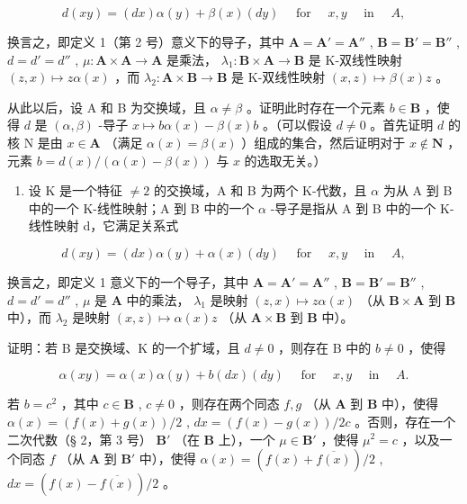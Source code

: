 \[
d (x y) = (d x) \alpha (y) + \beta (x) (d y) \quad \text { for } \quad x, y \quad \text { in } \quad A,
\]

换言之，即定义 1（第 2 号）意义下的导子，其中 \(\mathbf{A} = \mathbf{A}' = \mathbf{A}''\) , \(\mathbf{B} = \mathbf{B}' = \mathbf{B}''\) , \(d = d' = d''\) , \(\mu: \mathbf{A} \times \mathbf{A} \to \mathbf{A}\) 是乘法， \(\lambda_1: \mathbf{B} \times \mathbf{A} \to \mathbf{B}\) 是 K-双线性映射 \((z, x) \mapsto z\alpha(x)\) ，而 \(\lambda_2: \mathbf{A} \times \mathbf{B} \to \mathbf{B}\) 是 K-双线性映射 \((x, z) \mapsto \beta(x)z\) 。

从此以后，设 A 和 B 为交换域，且 \(\alpha \neq \beta\) 。证明此时存在一个元素 \(b \in \mathbf{B}\) ，使得 \(d\) 是 \((\alpha, \beta)\) -导子 \(x \mapsto b\alpha(x) - \beta(x)b\) 。（可以假设 \(d \neq 0\) 。首先证明 \(d\) 的核 N 是由 \(x \in \mathbf{A}\) （满足 \(\alpha(x) = \beta(x)\) ）组成的集合，然后证明对于 \(x \notin \mathbf{N}\) ，元素 \(b = d(x)/( \alpha(x) - \beta(x))\) 与 \(x\) 的选取无关。）

\begin{enumerate}
\def\labelenumi{\arabic{enumi}.}
\setcounter{enumi}{1}
\tightlist
\item
  设 K 是一个特征 \(\neq2\) 的交换域，A 和 B 为两个 K-代数，且 \(\alpha\) 为从 A 到 B 中的一个 K-线性映射；A 到 B 中的一个 \(\alpha\) -导子是指从 A 到 B 中的一个 K-线性映射 d，它满足关系式
\end{enumerate}

\[
d (x y) = (d x) \alpha (y) + \alpha (x) (d y) \quad \text { for } \quad x, y \quad \text { in } \quad A,
\]

换言之，即定义 1 意义下的一个导子，其中 \(\mathbf{A} = \mathbf{A}' = \mathbf{A}''\) , \(\mathbf{B} = \mathbf{B}' = \mathbf{B}''\) , \(d = d' = d''\) , \(\mu\) 是 \(\mathbf{A}\) 中的乘法， \(\lambda_1\) 是映射 \((z,x) \mapsto z\alpha(x)\) （从 \(\mathbf{B} \times \mathbf{A}\) 到 \(\mathbf{B}\) 中），而 \(\lambda_2\) 是映射 \((x,z) \mapsto \alpha(x)z\) （从 \(\mathbf{A} \times \mathbf{B}\) 到 \(\mathbf{B}\) 中）。

证明：若 B 是交换域、K 的一个扩域，且 \(d \neq 0\) ，则存在 B 中的 \(b \neq 0\) ，使得

\[
\alpha (x y) = \alpha (x) \alpha (y) + b (d x) (d y) \quad \text { for } \quad x, y \quad \text { in } \quad A.
\]

若 \(b = c^2\) ，其中 \(c \in \mathbf{B}\) , \(c \neq 0\) ，则存在两个同态 \(f, g\) （从 \(\mathbf{A}\) 到 \(\mathbf{B}\) 中），使得 \(\alpha(x) = (f(x) + g(x)) / 2\) , \(dx = (f(x) - g(x)) / 2c\) 。否则，存在一个二次代数（§ 2，第 3 号） \(\mathbf{B}'\) （在 \(\mathbf{B}\) 上），一个 \(\mu \in \mathbf{B}'\) ，使得 \(\mu^2 = c\) ，以及一个同态 \(f\) （从 \(\mathbf{A}\) 到 \(\mathbf{B}'\) 中），使得 \(\alpha(x) = (f(x) + \overline{f(x)}) / 2\) , \(dx = (f(x) - \overline{f(x)}) / 2\) 。

